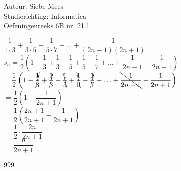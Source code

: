 \documentclass[a4paper]{article}
\begin{document}
  
\noindent \large Auteur: Siebe Mees \\
\noindent \large Studierichting: Informatica\\
\noindent \large Oefeningenreeks 6B nr. 21.1\\

\medskip

\normalsize

$\dfrac{1}{1 \cdot 3} + \dfrac{1}{3 \cdot 5} + \dfrac{1}{5 \cdot 7} + \ldots + \dfrac{1}{(2n-1)(2n+1)}$\\

$s_n = \dfrac{1}{2} \left(1 - \dfrac{1}{3} + \dfrac{1}{3} - \dfrac{1}{5} + \dfrac{1}{5} - \dfrac{1}{7} + \ldots + \dfrac{1}{2n-1} - \dfrac{1}{2n+1} \right)$\\

$ = \dfrac{1}{2} \left(1 - \cancel{\dfrac{1}{3}} + \cancel{\dfrac{1}{3}} - \bcancel{\dfrac{1}{5}} + \bcancel{\dfrac{1}{5}} - \cancel{\dfrac{1}{7}} + \ldots + \bcancel{\dfrac{1}{2n-1}} - \dfrac{1}{2n+1} \right)$\\

$= \dfrac{1}{2} \left(1 - \dfrac{1}{2n+1} \right)$\\

$= \dfrac{1}{2} \left(\dfrac{2n+1}{2n+1} - \dfrac{1}{2n+1} \right)$\\

$= \dfrac{1}{2} \cdot \dfrac{2n}{2n+1}$\\

$= \dfrac{n}{2n+1}$\\

\begin{thebibliography}{999}
\end{thebibliography}
\end{document}
